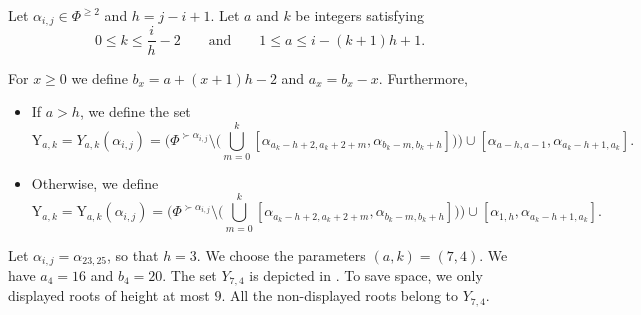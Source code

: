 \begin{definition}\rm   \label{def: SSS and YYY}
Let $\alpha_{i,j}\in \Phi^{\geq 2}$ and $h=j-i+1$.
Let $a$ and $k$ be integers satisfying
\begin{equation}
 0\leq k \leq \frac{i}{h}-2    \qquad \mbox{and} \qquad   1\leq a\leq i-(k+1)h+1.
\end{equation}


For $x\geq 0$ we define $ b_{x} = a+(x+1)h-2$ and $a_{x} = b_x-x$.
Furthermore,%
\begin{itemize}
    \item If $a > h$, we define the set
\begin{equation}\label{eq: def YYY}
    \mathrm{Y}_{a,k} = Y_{a,k}(\alpha_{i,j})=
    \Biggl(
        \Phi^{\succ \alpha_{i,j}}
        \setminus
        \Biggl(
            \bigcup_{m=0}^{k}
            [\alpha_{a_{k}-h+2,a_{k}+2+m},\alpha_{b_{k}-m,b_{k}+h}]
        \Biggr)
    \Biggr)
    \cup
    [\alpha_{a-h,a-1},\alpha_{a_{k}-h+1,a_{k}}].
\end{equation}
    \item Otherwise, we define
\begin{equation}\label{eq: def YYYB}
    \mathrm{Y}_{a,k} = \mathrm{Y}_{a,k}(\alpha_{i,j})=
    \Biggl(
        \Phi^{\succ \alpha_{i,j}}
        \setminus
        \Biggl(
            \bigcup_{m=0}^{k}
            [\alpha_{a_{k}-h+2,a_{k}+2+m},\alpha_{b_{k}-m,b_{k}+h}]
        \Biggr)
    \Biggr)
    \cup
    [\alpha_{1,h},\alpha_{a_{k}-h+1,a_{k}}].
\end{equation}
\end{itemize}
\end{definition}





\begin{example}\rm 
     Let $\alpha_{i,j}=\alpha_{23,25}$, so that $h=3$.
     We choose the parameters $(a,k)=(7,4)$. 
     We have $a_4=16$ and $b_4=20$. 
     The set $Y_{7,4}$ is depicted in .
     To save space, we only displayed roots of height at most $9$. 
     All the non-displayed roots belong to $Y_{7,4}$.
\end{example}




